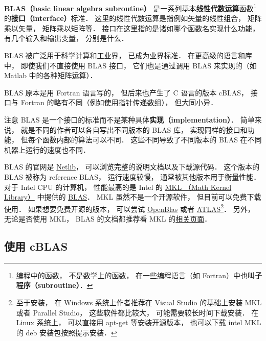 

\textbf{BLAS（basic linear algebra subroutine）} 是一系列基本\textbf{线性代数运算}函数\footnote{编程中的函数， 不是数学上的函数， 在一些编程语言（如 Fortran）中也叫\textbf{子程序（subroutine）}．}的\textbf{接口（interface）}标准．  这里的线性代数运算是指例如矢量的线性组合， 矩阵乘以矢量， 矩阵乘以矩阵等． 接口在这里指的是诸如哪个函数名实现什么功能， 有几个输入和输出变量， 分别是什么．

BLAS 被广泛用于科学计算和工业界， 已成为业界标准． 在更高级的语言和库中， 即使我们不直接使用 BLAS 接口， 它们也是通过调用 BLAS 来实现的（如 Matlab 中的各种矩阵运算）．

BLAS 原本是用 Fortran 语言写的， 但后来也产生了 C 语言的版本 cBLAS， 接口与 Fortran 的略有不同（例如使用指针传递数组）， 但大同小异．

注意 BLAS 是一个接口的标准而不是某种具体\textbf{实现（implementation）}． 简单来说， 就是不同的作者可以各自写出不同版本的 BLAS 库， 实现同样的接口和功能， 但每个函数内部的算法可以不同．  这些不同导致了不同版本的 BLAS 在不同机器上运行的速度也不同．

BLAS 的官网是 \href{http://www.netlib.org/blas/}{Netlib}， 可以浏览完整的说明文档以及下载源代码． 这个版本的 BLAS 被称为 reference BLAS， 运行速度较慢， 通常被其他版本用于衡量性能． 对于 Intel CPU 的计算机， 性能最高的是 Intel 的 \href{https://software.intel.com/en-us/mkl}{MKL （Math Kernel Library）} 中提供的 \href{https://software.intel.com/en-us/mkl-developer-reference-c-blas-and-sparse-blas-routines}{BLAS}． MKL 虽然不是一个开源软件， 但目前可以免费下载使用． 如果想要免费开源的版本， 可以尝试 \href{https://www.openblas.net/}{OpenBlas} 或者 \href{https://sourceforge.net/projects/math-atlas/}{ATLAS}\footnote{至于安装， 在 Windows 系统上作者推荐在 Visual Studio 的基础上安装 MKL 或者 Parallel Studio， 这些软件都比较大， 可能需要较长时间下载安装． 在 Linux 系统上， 可以直接用 apt-get 等安装开源版本， 也可以下载 intel MKL 的 deb 安装包按照提示安装．}． 另外， 无论是否使用 MKL， BLAS 的文档都推荐看 MKL 的\href{https://software.intel.com/en-us/mkl-developer-reference-c-blas-and-sparse-blas-routines}{相关页面}．

\subsection{使用 cBLAS}

